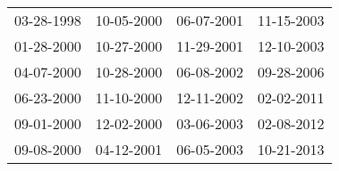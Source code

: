 \begin{supertabular}{llll}
 03-28-1998 &  10-05-2000 &  06-07-2001 &  11-15-2003 \\
 01-28-2000 &  10-27-2000 &  11-29-2001 &  12-10-2003 \\
 04-07-2000 &  10-28-2000 &  06-08-2002 &  09-28-2006 \\
 06-23-2000 &  11-10-2000 &  12-11-2002 &  02-02-2011 \\
 09-01-2000 &  12-02-2000 &  03-06-2003 &  02-08-2012 \\
 09-08-2000 &  04-12-2001 &  06-05-2003 &  10-21-2013 \\
\end{supertabular}
